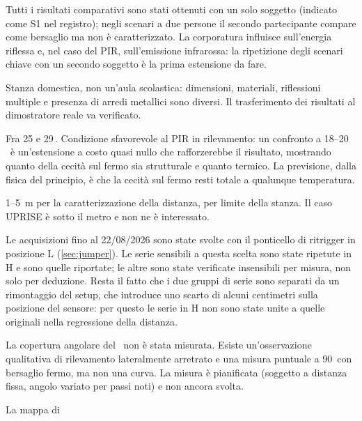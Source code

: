 \begin{description}[leftmargin=1.4em,style=nextline,itemsep=3pt]
  \item[Numero di soggetti] Tutti i risultati comparativi sono stati ottenuti con un
    solo soggetto (indicato come S1 nel registro); negli scenari a due persone il
    secondo partecipante compare come bersaglio ma non è caratterizzato. La corporatura
    influisce sull'energia riflessa e, nel caso del PIR, sull'emissione infrarossa: la
    ripetizione degli scenari chiave con un secondo soggetto è la prima estensione da
    fare.
  \item[Ambiente] Stanza domestica, non un'aula scolastica: dimensioni, materiali,
    riflessioni multiple e presenza di arredi metallici sono diversi. Il trasferimento
    dei risultati al dimostratore reale va verificato.
  \item[Temperatura] Fra 25 e 29\,\celsius. Condizione sfavorevole al PIR in
    rilevamento: un confronto a 18--20\,\celsius\ è un'estensione a costo quasi nullo
    che rafforzerebbe il risultato, mostrando quanto della cecità sul fermo sia
    strutturale e quanto termico. La previsione, dalla fisica del principio, è che la
    cecità sul fermo resti totale a qualunque temperatura.
  \item[Range] 1--5~m per la caratterizzazione della distanza, per limite della stanza.
    Il caso UPRISE è sotto il metro e non ne è interessato.
  \item[Configurazione del PIR nella prima fase] Le acquisizioni fino al 22/08/2026
    sono state svolte con il ponticello di ritrigger in posizione L
    (\cref{sec:jumper}). Le serie sensibili a questa scelta sono state ripetute in H e
    sono quelle riportate; le altre sono state verificate insensibili per misura, non
    solo per deduzione. Resta il fatto che i due gruppi di serie sono separati da un
    rimontaggio del setup, che introduce uno scarto di alcuni centimetri sulla posizione
    del sensore: per questo le serie in H non sono state unite a quelle originali nella
    regressione della distanza.
  \item[Nessuna caratterizzazione angolare] La copertura angolare del \ldb\ non è stata
    misurata. Esiste un'osservazione qualitativa di rilevamento lateralmente arretrato e
    una misura puntuale a 90\textdegree\ con bersaglio fermo, ma non una curva. La
    misura è pianificata (soggetto a distanza fissa, angolo variato per passi noti) e
    non ancora svolta.
  \item[Copertura angolare misurata a una sola distanza] La mappa di

\end{description}
